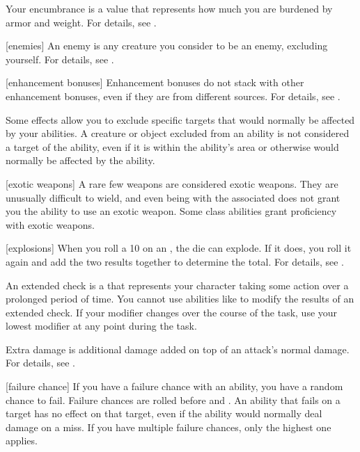  Your encumbrance is a value that represents how much you are burdened by armor and weight.
For details, see .

[enemies] An enemy is any creature you consider to be an enemy, excluding yourself.
For details, see .

[enhancement bonuses] Enhancement bonuses do not stack with other enhancement bonuses, even if they are from different sources.
For details, see .

 Some effects allow you to exclude specific targets that would normally be affected by your abilities.
A creature or object excluded from an ability is not considered a target of the ability, even if it is within the ability's area or otherwise would normally be affected by the ability.

[exotic weapons] A rare few weapons are considered exotic weapons.
They are unusually difficult to wield, and even being  with the associated  does not grant you the ability to use an exotic weapon.
Some class abilities grant proficiency with exotic weapons.

[explosions] When you roll a 10 on an , the die can explode.
If it does, you roll it again and add the two results together to determine the total.
For details, see .

 An extended check is a  that represents your character taking some action over a prolonged period of time.
You cannot use abilities like  to modify the results of an extended check.
If your modifier changes over the course of the task, use your lowest modifier at any point during the task.

 Extra damage is additional damage added on top of an attack's normal damage.
For details, see .

[failure chance] If you have a failure chance with an ability, you have a random chance to fail.
Failure chances are rolled before  and .
An ability that fails on a target has no effect on that target, even if the ability would normally deal damage on a miss.
If you have multiple failure chances, only the highest one applies.

